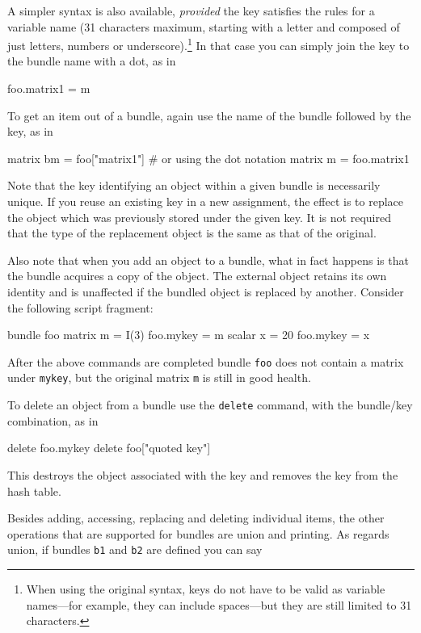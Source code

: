 A simpler syntax is also available, \emph{provided} the key satisfies
the rules for a  variable name (31 characters maximum,
starting with a letter and composed of just letters, numbers or
underscore).\footnote{When using the original syntax, keys do not have
  to be valid as variable names---for example, they can include
  spaces---but they are still limited to 31 characters.}  In that case
you can simply join the key to the bundle name with a dot, as in

\begin{code}
foo.matrix1 = m
\end{code}

To get an item out of a bundle, again use the name of the bundle
followed by the key, as in

\begin{code}
matrix bm = foo["matrix1"]
# or using the dot notation
matrix m = foo.matrix1
\end{code}

Note that the key identifying an object within a given bundle is
necessarily unique. If you reuse an existing key in a new assignment,
the effect is to replace the object which was previously stored under
the given key. It is not required that the type of the replacement
object is the same as that of the original.

Also note that when you add an object to a bundle, what in fact
happens is that the bundle acquires a copy of the object. The external
object retains its own identity and is unaffected if the bundled
object is replaced by another. Consider the following script fragment:

\begin{code}
bundle foo
matrix m = I(3)
foo.mykey = m
scalar x = 20
foo.mykey = x
\end{code}

After the above commands are completed bundle \texttt{foo} does not
contain a matrix under \texttt{mykey}, but the original matrix
\texttt{m} is still in good health.

To delete an object from a bundle use the \texttt{delete} command,
with the bundle/key combination, as in

\begin{code}
delete foo.mykey
delete foo["quoted key"]
\end{code}

This destroys the object associated with the key and removes the key
from the hash table.

Besides adding, accessing, replacing and deleting individual items,
the other operations that are supported for bundles are union and
printing. As regards union, if bundles \texttt{b1} and \texttt{b2} are
defined you can say

